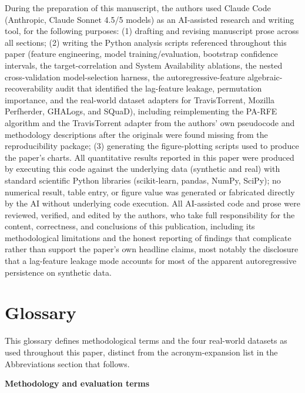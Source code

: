 \documentclass[technologies,article,submit,pdftex,moreauthors]{Definitions/mdpi}
\begin{document}
During the preparation of this manuscript, the authors used Claude Code (Anthropic, Claude Sonnet 4.5/5 models) as an AI-assisted research and writing tool, for the following purposes: (1) drafting and revising manuscript prose across all sections; (2) writing the Python analysis scripts referenced throughout this paper (feature engineering, model training/evaluation, bootstrap confidence intervals, the target-correlation and System Availability ablations, the nested cross-validation model-selection harness, the autoregressive-feature algebraic-recoverability audit that identified the lag-feature leakage, permutation importance, and the real-world dataset adapters for TravisTorrent, Mozilla Perfherder, GHALogs, and SQuaD), including reimplementing the PA-RFE algorithm and the TravisTorrent adapter from the authors' own pseudocode and methodology descriptions after the originals were found missing from the reproducibility package; (3) generating the figure-plotting scripts used to produce the paper's charts. All quantitative results reported in this paper were produced by executing this code against the underlying data (synthetic and real) with standard scientific Python libraries (scikit-learn, pandas, NumPy, SciPy); no numerical result, table entry, or figure value was generated or fabricated directly by the AI without underlying code execution. All AI-assisted code and prose were reviewed, verified, and edited by the authors, who take full responsibility for the content, correctness, and conclusions of this publication, including its methodological limitations and the honest reporting of findings that complicate rather than support the paper's own headline claims, most notably the disclosure that a lag-feature leakage mode accounts for most of the apparent autoregressive persistence on synthetic data.

\section*{Glossary}\label{sec:glossary}

This glossary defines methodological terms and the four real-world datasets as used throughout this paper, distinct from the acronym-expansion list in the Abbreviations section that follows.

\textbf{Methodology and evaluation terms}
\end{document}
